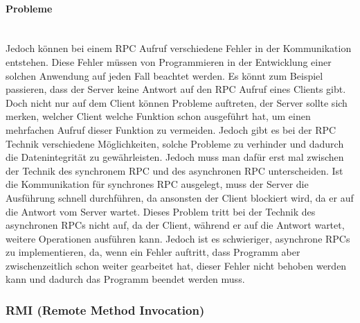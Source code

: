 \paragraph{Probleme} \mbox{} \vspace{2mm} \\
Jedoch können bei einem RPC Aufruf verschiedene Fehler in der Kommunikation entstehen. Diese Fehler müssen von Programmieren in der Entwicklung einer solchen Anwendung auf jeden Fall beachtet werden. Es könnt zum Beispiel passieren, dass der Server keine Antwort auf den RPC Aufruf eines Clients gibt. Doch nicht nur auf dem Client können Probleme auftreten, der Server sollte sich merken, welcher Client welche Funktion schon ausgeführt hat, um einen mehrfachen Aufruf dieser Funktion zu vermeiden. Jedoch gibt es bei der RPC Technik verschiedene Möglichkeiten, solche Probleme zu verhinder und dadurch die Datenintegrität zu gewährleisten. Jedoch muss man dafür erst mal zwischen der Technik des synchronem RPC und des asynchronen RPC unterscheiden. Ist die Kommunikation für synchrones RPC ausgelegt, muss der Server die Ausführung schnell durchführen, da ansonsten der Client blockiert wird, da er auf die Antwort vom Server wartet. Dieses Problem tritt bei der Technik des asynchronen RPCs nicht auf, da der Client, während er auf die Antwort wartet, weitere Operationen ausführen kann. Jedoch ist es schwieriger, asynchrone RPCs zu implementieren, da, wenn ein Fehler auftritt, dass Programm aber zwischenzeitlich schon weiter gearbeitet hat, dieser Fehler nicht behoben werden kann und dadurch das Programm beendet werden muss.


\subsubsection{RMI (Remote Method Invocation)}

